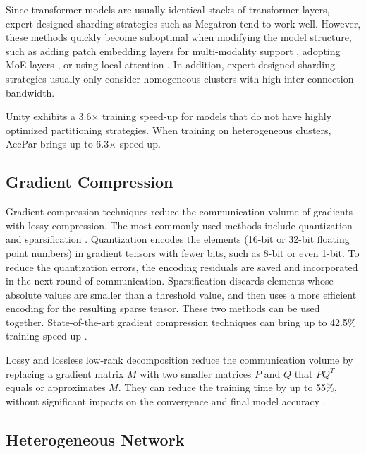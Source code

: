 \documentclass[a4paper, 11pt]{article}
\begin{document}
    Since transformer models are usually identical stacks of transformer layers, expert-designed sharding strategies
    such as Megatron \cite{megatron} tend to work well. However, these methods quickly become suboptimal when modifying
    the model structure, such as adding patch embedding layers for multi-modality support \cite{vit}, adopting MoE
    layers \cite{moe}, or using local attention \cite{longformer}. In addition, expert-designed sharding strategies
    usually only consider homogeneous clusters with high inter-connection bandwidth.

    Unity \cite{unity} exhibits a 3.6$\times$ training speed-up for models that do not have highly optimized
    partitioning strategies. When training on heterogeneous clusters, AccPar \cite{accpar} brings up to 6.3$\times$
    speed-up.

    \subsection{Gradient Compression}

    Gradient compression techniques reduce the communication volume of gradients with lossy compression. The most
    commonly used methods include quantization \cite{quantization1} and sparsification \cite{sparsification1}.
    Quantization encodes the elements (16-bit or 32-bit floating point numbers) in gradient tensors with fewer bits,
    such as 8-bit or even 1-bit. To reduce the quantization errors, the encoding residuals are saved and incorporated in
    the next round of communication. Sparsification discards elements whose absolute values are smaller than a threshold
    value, and then uses a more efficient encoding for the resulting sparse tensor. These two methods can be used together.
    State-of-the-art gradient compression techniques can bring up to 42.5\% training speed-up
    \cite{gradientcompressionsurvey}.

    Lossy \cite{powersgd} and lossless \cite{sfb} low-rank decomposition reduce the communication volume by replacing a
    gradient matrix $M$ with two smaller matrices $P$ and $Q$ that $PQ^T$ equals or approximates $M$. They can reduce
    the training time by up to 55\%, without significant impacts on the convergence and final model accuracy
    \cite{powersgd}.

    \subsection{Heterogeneous Network}
\end{document}

